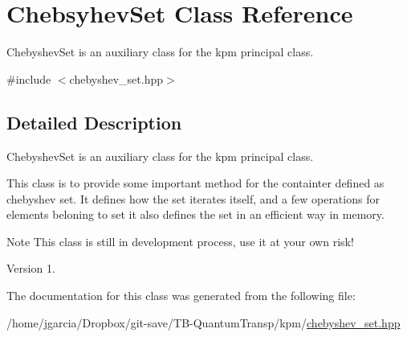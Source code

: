 \hypertarget{classChebsyhevSet}{\section{Chebsyhev\+Set Class Reference}
\label{classChebsyhevSet}
}


Chebyshev\+Set is an auxiliary class for the kpm principal class.  




{\ttfamily \#include $<$chebyshev\+\_\+set.\+hpp$>$}



\subsection{Detailed Description}
Chebyshev\+Set is an auxiliary class for the kpm principal class. 

This class is to provide some important method for the containter defined as chebyshev set. It defines how the set iterates itself, and a few operations for elements beloning to set it also defines the set in an efficient way in memory.

\begin{DoxyNote}{Note}
This class is still in development process, use it at your own risk!
\end{DoxyNote}
\begin{DoxyVersion}{Version}
1. 
\end{DoxyVersion}


The documentation for this class was generated from the following file\+:\begin{DoxyCompactItemize}
\item 
/home/jgarcia/\+Dropbox/git-\/save/\+T\+B-\/\+Quantum\+Transp/kpm/\hyperlink{chebyshev__set_8hpp}{chebyshev\+\_\+set.\+hpp}\end{DoxyCompactItemize}

